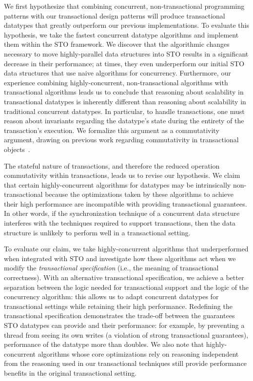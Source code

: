 We first hypothesize that combining concurrent, non-transactional programming patterns with our transactional design patterns will produce transactional datatypes that greatly outperform our previous implementations. To evaluate this hypothesis, we take the fastest concurrent datatype algorithms and implement them within the STO framework. We discover that the algorithmic changes necessary to move highly-parallel data structures into STO results in a significant decrease in their performance; at times, they even underperform our initial STO data structures that use naive algorithms for concurrency.
Furthermore, our experience combining highly-concurrent, non-transactional algorithms with transactional algorithms leads us to conclude that reasoning about scalability in transactional datatypes is inherently different than reasoning about scalability in traditional concurrent datatypes. In particular, to handle transactions, one must reason about invariants regarding the datatype's state during the entirety of the transaction's execution. We formalize this argument as a commutativity argument, drawing on previous work regarding commutativity in transactional objects~\cite{weihl}.

The stateful nature of transactions, and therefore the reduced operation commutativity within transactions, leads us to revise our hypothesis. 
We claim that certain highly-concurrent algorithms for datatypes may be intrinsically non-transactional because the optimizations taken by these algorithms to achieve their high performance are incompatible with providing transactional guarantees. In other words, if the synchronization technique of a concurrent data structure interferes with the techniques required to support transactions, then the data structure is unlikely to perform well in a transactional setting. 

To evaluate our claim, we take highly-concurrent algorithms that underperformed when integrated with STO and investigate how these algorithms act when we modify the \emph{transactional specification} (i.e., the meaning of transactional correctness).
With an alternative transactional specification, we achieve a better separation between the logic needed for transactional support and the logic of the concurrency algorithm: this allows us to adapt concurrent datatypes for transactional settings while retaining their high performance.
Redefining the transactional specification demonstrates the trade-off between the guarantees STO datatypes can provide and their performance: for example, by preventing a thread from seeing its own writes (a violation of strong transactional guarantees), performance of the datatype more than doubles.
We also note that highly-concurrent algorithms whose core optimizations rely on reasoning independent from the reasoning used in our transactional techniques still provide performance benefits in the original transactional setting.

